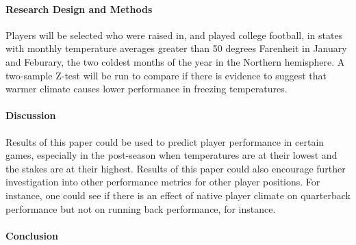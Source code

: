 \documentclass[12pt]{article}
\begin{document}
\lipsum[3]

\paragraph{Research Design and Methods}
Players will be selected who were raised in, and played college football, in states with monthly temperature averages greater than 50 degrees Farenheit in January and Feburary, the two coldest months of the year in the Northern hemisphere. A two-sample Z-test will be run to compare if there is evidence to suggest that warmer climate causes lower performance in freezing temperatures. 

\lipsum[4]

\paragraph{Discussion}
Results of this paper could be used to predict player performance in certain games, especially in the post-season when temperatures are at their lowest and the stakes are at their highest. Results of this paper could also encourage further investigation into other performance metrics for other player positions. For instance, one could see if there is an effect of native player climate on quarterback performance but not on running back performance, for instance.

\lipsum[5] 

\paragraph{Conclusion}
\lipsum[1]




\end{document}
